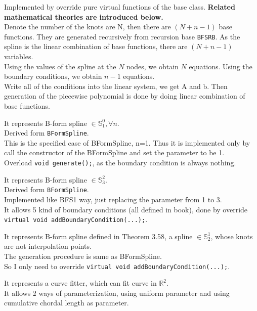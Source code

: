 \documentclass[a4paper]{article}
\begin{document}
\begin{description}
  Implemented by override pure virtual functions of the base class. \textbf{Related mathematical theories are introduced below.}\\
  Denote the number of the knots are N, then there are $(N+n-1)$ base functions. They are generated recursively from recursion base \texttt{BFSRB}.
  As the spline is the linear combination of base functions, there are $(N+n-1)$ variables.\\
  Using the values of the spline at the \(N\) nodes, we obtain \(N\) equations. 
  Using the boundary conditions, we obtain \(n-1\) equations.\\
  Write all of the conditions into the linear system, we get A and b. 
  Then generation of the piecewise polynomial is done by doing linear combination of base functions.
  \item[BFS1]
  It represents B-form spline $\in \mathbb{S}_1^0, \forall n$.\\
  Derived form \texttt{BFormSpline}.\\
  This is the specified case of BFormSpline, n=1. Thus it is implemented only by call the constructor of the BFormSpline and set the parameter to be 1.\\
  Overload \texttt{void generate();}, as the boundary condition is always nothing.
  \item[BFS3]
  It represents B-form spline $\in \mathbb{S}_3^2$.\\ 
  Derived form \texttt{BFormSpline}.\\
  Implemented like BFS1 way, just replacing the parameter from 1 to 3.\\
  It allows 5 kind of boundary conditions (all defined in book\cite{Defn_3_5}), done by override \texttt{virtual void addBoundaryCondition(...);}.\\
  \item[BFS\_Thm\_3\_58]
  It represents B-form spline defined in Theorem 3.58\cite*{Thm_3_58}, a spline $\in \mathbb{S}_2^1$, whose knots are not interpolation points.\\ 
  The generation procedure is same as BFormSpline.\\
  So I only need to override \texttt{virtual void addBoundaryCondition(...);}.
  \item[CurveFitter]
  It represents a curve fitter, which can fit curve in \(\mathbb{R}^2\). \\
  It allows 2 ways of parameterization, using uniform parameter and using cumulative chordal length as parameter.\\

\end{description}
\end{document}
